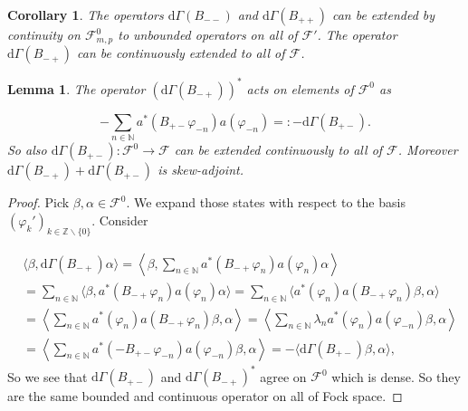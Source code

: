 \documentclass[b5paper,draft,openbib,12pt]{memoir}
\newtheorem{Lemma}[Def]{Lemma}
\newtheorem{Corollary}[Def]{Corollary}
\begin{document}
\begin{Corollary}
The operators \(\mathrm{d}\Gamma(B_{--})\) and \(\mathrm{d}\Gamma(B_{++})\) can be extended by continuity on \(\mathcal{F}^0_{m,p}\) to unbounded operators on all of \(\mathcal{F}'\).
The operator \(\mathrm{d}\Gamma(B_{-+})\) can be continuously extended to all of \(\mathcal{F}\).
\end{Corollary}

\begin{Lemma}
The operator \(\left(\mathrm{d}\Gamma(B_{-+})\right)^*\)  acts on elements of \(\mathcal{F}^0\) as

\begin{equation}
- \sum_{n\in\mathbb{N}} a^*(B_{+-}\varphi_{-n}) a(\varphi_{-n})=:-\mathrm{d}\Gamma(B_{+-}).
\end{equation}
So also \(\mathrm{d}\Gamma(B_{+-}):\mathcal{F}^0\rightarrow \mathcal{F}\) can be extended continuously to all of \(\mathcal{F}\).
Moreover \(\mathrm{d}\Gamma(B_{-+})+\mathrm{d}\Gamma(B_{+-})\) is skew-adjoint.
\end{Lemma}
\begin{proof}
Pick \(\beta,\alpha \in \mathcal{F}^0\). We expand those states with respect to the basis \((\varphi_k')_{k\in\mathbb{Z}\backslash \{0\}}\). Consider

\begin{align}\nonumber
&\langle \beta, \mathrm{d}\Gamma(B_{-+}) \alpha \rangle=\left\langle \beta, \sum_{n\in\mathbb{N}} a^*(B_{-+}\varphi_n)a(\varphi_{n}) \alpha \right\rangle\\\nonumber
&=\sum_{n\in\mathbb{N}} \langle \beta , a^*(B_{-+}\varphi_n)a(\varphi_{n}) \alpha\rangle
=\sum_{n\in\mathbb{N}}  \langle a^*(\varphi_{n})  a(B_{-+}\varphi_n)\beta , \alpha\rangle\\\nonumber
&=\left\langle \sum_{n\in\mathbb{N}}a^*(\varphi_{n})  a(B_{-+}\varphi_n) \beta, \alpha \right\rangle
=\left\langle \sum_{n\in\mathbb{N}} \lambda_n a^*(\varphi_{n})  a(\varphi_{-n}) \beta, \alpha \right\rangle\\
&=\left\langle \sum_{n\in\mathbb{N}}  a^*(- B_{+-}\varphi_{-n})  a(\varphi_{-n}) \beta, \alpha \right\rangle
=-\langle \mathrm{d}\Gamma(B_{+-})  \beta, \alpha \rangle,
\end{align}
 So we see that \(\mathrm{d}\Gamma(B_{+-})\)
and \(\mathrm{d}\Gamma(B_{-+})^*\) agree on \(\mathcal{F}^0\) which is dense. So they are the same bounded and continuous operator on all of
Fock space. 
\end{proof}
\end{document}
